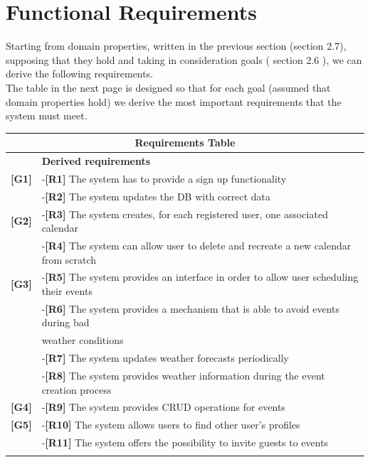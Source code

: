 \documentclass[12pt]{book}
\begin{document}
\section{Functional Requirements}

Starting from domain properties, written in the previous section (section 2.7), supposing that they hold and taking in consideration goals ( section 2.6 ), we can derive the following requirements. \\

The table in the next page is designed so that for each goal (assumed that domain properties hold) we derive the most important requirements that the system must meet.  \\

\begin{tabular}{ |l|l| }
  		\hline
  		\hline
  		\multicolumn{2}{|c|}{\large{\textbf{Requirements Table}}} \\
  		\hline
  		\hline
  		\textbf{ } & \textbf{Derived requirements } \\ 
  		\hline
  			\textbf{[G1]} & 
					-\textbf{[R1]} The system has to provide a sign up functionality  \\&
					-\textbf{[R2]} The system updates the DB with correct data \\
			\textbf{[G2]}  & 
					-\textbf{[R3]} The system creates, for each registered user, one associated calendar \\&
					-\textbf{[R4]} The system can allow user to delete and recreate a new calendar from 						scratch\\	
			\textbf{[G3]} & 
					-\textbf{[R5]} The system provides an interface in order to allow user scheduling their					events\\&
					-\textbf{[R6]} The system provides a mechanism that is able to avoid events during bad\\& weather conditions\\&
					-\textbf{[R7]} The system updates weather forecasts periodically\\&
					-\textbf{[R8]} The system provides weather information during the event creation process \\
			\textbf{[G4]} & 
					-\textbf{[R9]} The system provides CRUD operations for events\\
			\textbf{[G5]} & 
					-\textbf{[R10]} The system allows users to find other user's profiles\\&
					-\textbf{[R11]} The system offers the possibility to invite guests to events\\&  

\end{tabular}
\end{document}
